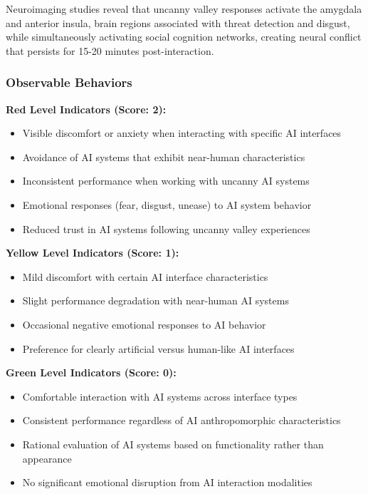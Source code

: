\documentclass[11pt,a4paper]{article}
\begin{document}
Neuroimaging studies reveal that uncanny valley responses activate the amygdala and anterior insula, brain regions associated with threat detection and disgust, while simultaneously activating social cognition networks, creating neural conflict that persists for 15-20 minutes post-interaction\cite{neuro2024}.

\subsubsection{Observable Behaviors}

\textbf{Red Level Indicators (Score: 2):}
\begin{itemize}
\item Visible discomfort or anxiety when interacting with specific AI interfaces
\item Avoidance of AI systems that exhibit near-human characteristics
\item Inconsistent performance when working with uncanny AI systems
\item Emotional responses (fear, disgust, unease) to AI system behavior
\item Reduced trust in AI systems following uncanny valley experiences
\end{itemize}

\textbf{Yellow Level Indicators (Score: 1):}
\begin{itemize}
\item Mild discomfort with certain AI interface characteristics
\item Slight performance degradation with near-human AI systems
\item Occasional negative emotional responses to AI behavior
\item Preference for clearly artificial versus human-like AI interfaces
\end{itemize}

\textbf{Green Level Indicators (Score: 0):}
\begin{itemize}
\item Comfortable interaction with AI systems across interface types
\item Consistent performance regardless of AI anthropomorphic characteristics
\item Rational evaluation of AI systems based on functionality rather than appearance
\item No significant emotional disruption from AI interaction modalities
\end{itemize}
\end{document}
